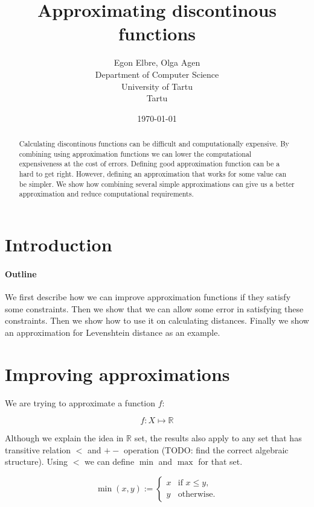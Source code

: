 \documentclass [12pt]{article} %
\title{Approximating discontinous functions}
\author{
    Egon Elbre, Olga Agen \\
        Department of Computer Science \\
    University of Tartu\\
    Tartu\\
}
\date{\today}
\begin{document}
\maketitle

\begin{abstract}
Calculating discontinous functions can be difficult and computationally
expensive. By combining using approximation functions we can lower 
the computational expensiveness at the cost of errors.
Defining good approximation function can be a hard to get right. 
However, defining an approximation that works for some value can 
be simpler. We show how combining several simple approximations 
can give us a better approximation and reduce computational requirements.
\end{abstract}

\section{Introduction}

\paragraph{Outline}

We first describe how we can improve approximation functions if they 
satisfy some constraints. Then we show that we can allow some error
in satisfying these constraints. Then we show how to use it on 
calculating distances. Finally we show an approximation for
Levenshtein distance as an example.

\section{Improving approximations}

\newcommand{\Real}{\mathbb{R}}
\newcommand{\defas}{ := }
\newcommand{\err}[1]{\varepsilon_{#1}}

We are trying to approximate a function $f$:

$$f : X \mapsto \Real$$

Although we explain the idea in $\Real$ set, the results also apply to 
any set that has transitive relation $<$ and $+-$ operation (TODO: find the correct algebraic structure). 
Using $<$ we can define $\min$ and $\max$ for that set.

$$ \min(x,y) \defas \begin{cases}
    x & \text{if $x \leq y$}, \\
    y & \text{otherwise}.
\end{cases}
$$
\end{document}
